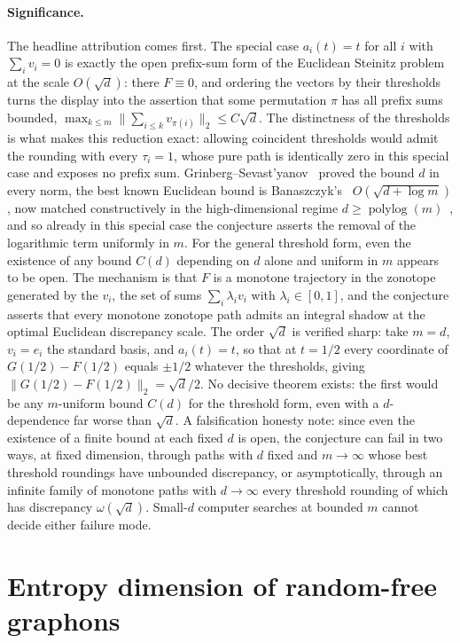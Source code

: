 \documentclass[11pt]{article}
\theoremstyle{definition}
\begin{document}
\paragraph{Significance.}
The headline attribution comes first.  The special case $a_i(t)=t$ for
all $i$ with $\sum_iv_i=0$ is exactly the open prefix-sum form of the
Euclidean Steinitz problem at the scale $O(\sqrt d)$: there $F\equiv0$,
and ordering the vectors by their thresholds turns the display into
the assertion that some permutation $\pi$ has all prefix sums bounded,
$\max_{k\le m}\|\sum_{i\le k}v_{\pi(i)}\|_2\le C\sqrt d$.
The distinctness of the thresholds is what makes this reduction
exact: allowing coincident thresholds would admit the rounding with
every $\tau_i=1$, whose pure path is identically zero in this
special case and exposes no prefix sum.
Grinberg--Sevast'yanov~\cite{GS80} proved the bound $d$ in every norm, the best known Euclidean bound is Banaszczyk's~\cite{Ban98,Ban12} $O(\sqrt{d+\log m})$, now matched constructively in the high-dimensional regime $d\ge\operatorname{polylog}(m)$~\cite{DJJ26}, and so already in this special case the conjecture asserts the removal of the logarithmic term uniformly in $m$.  For the general threshold form,
even the existence of any bound $C(d)$ depending on $d$ alone and
uniform in $m$ appears to be open.  The mechanism is that $F$ is a
monotone trajectory in the zonotope generated by the $v_i$, the set of
sums $\sum_i\lambda_iv_i$ with $\lambda_i\in[0,1]$, and the conjecture
asserts that every monotone zonotope path admits an integral shadow at
the optimal Euclidean discrepancy scale.  The order $\sqrt d$ is
verified sharp: take $m=d$, $v_i=e_i$ the standard basis, and
$a_i(t)=t$, so that at $t=1/2$ every coordinate of $G(1/2)-F(1/2)$
equals $\pm1/2$ whatever the thresholds, giving
$\|G(1/2)-F(1/2)\|_2=\sqrt d/2$.  No decisive theorem exists: the
first would be any $m$-uniform bound $C(d)$ for the threshold form,
even with a $d$-dependence far worse than $\sqrt d$.  A falsification honesty note: since even the existence of a finite bound at each fixed $d$ is open, the conjecture can fail in two ways, at fixed dimension, through paths with $d$ fixed and $m\to\infty$ whose best threshold roundings have unbounded discrepancy, or asymptotically, through an infinite family of monotone paths with $d\to\infty$ every threshold rounding of which has discrepancy $\omega(\sqrt d)$. Small-$d$ computer searches at bounded $m$ cannot decide either failure mode.

\section{Entropy dimension of random-free graphons}
\end{document}
